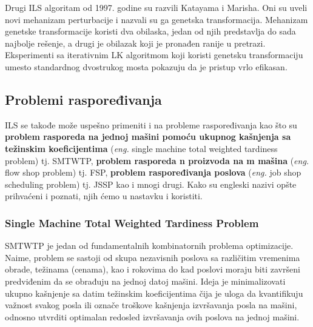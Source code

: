 \documentclass[a4paper]{article}
\newcommand{\eng}[1]{(\textit{eng.} #1)}
\begin{document}
Drugi ILS algoritam od 1997. godine su razvili Katayama i Marisha. Oni su uveli novi mehanizam perturbacije i nazvali su ga genetska transformacija. Mehanizam genetske transformacije koristi dva obilaska, jedan od njih predstavlja do sada najbolje rešenje, a drugi je obilazak koji je pronađen ranije u pretrazi. Eksperimenti sa iterativnim LK algoritmom koji koristi genetsku transformaciju umesto standardnog dvostrukog mosta pokazuju da je pristup vrlo efikasan.





\subsection{Problemi raspoređivanja}
ILS se takođe može uspešno primeniti i na probleme raspoređivanja kao što su \textbf{problem rasporeda na jednoj mašini pomoću ukupnog kašnjenja sa težinskim koeficijentima} \eng{single machine total weighted tardiness problem} tj. SMTWTP,  \textbf{problem rasporeda n proizvoda na m mašina} \eng{flow shop problem} tj. FSP, \textbf{problem raspoređivanja poslova} \eng{job shop scheduling problem} tj. JSSP
kao i mnogi drugi. Kako su engleski nazivi opšte prihvaćeni i poznati, njih ćemo u nastavku i koristiti.
\subsubsection{Single Machine Total Weighted Tardiness Problem}
SMTWTP je jedan od fundamentalnih kombinatornih problema optimizacije. Naime, problem se sastoji od skupa nezavisnih poslova sa različitim vremenima obrade, težinama (cenama), kao i rokovima do kad poslovi moraju biti završeni predviđenim da se obrađuju na jednoj datoj mašini. Ideja je minimalizovati ukupno kašnjenje sa datim težinskim koeficijentima čija je uloga da kvantifikuju važnost svakog posla ili označe troškove kašnjenja izvršavanja posla na mašini, odnosno utvrditi optimalan redosled izvršavanja ovih poslova na jednoj mašini.
\cite{handbookOfMetaheuristics}
\end{document}
